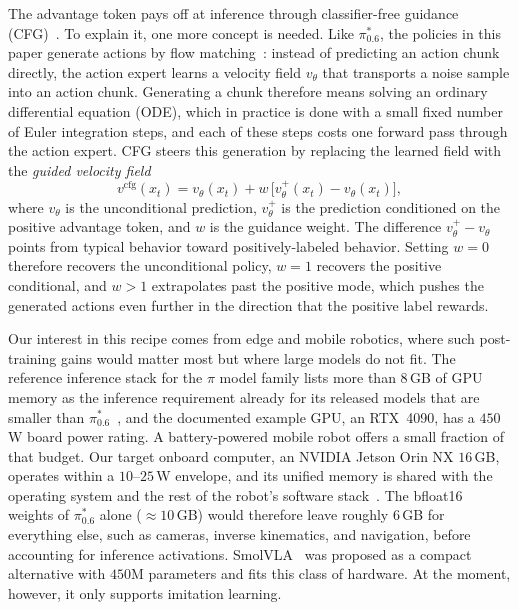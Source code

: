 \documentclass[conference]{IEEEtran}
\begin{document}
The advantage token pays off at inference through classifier-free guidance
(CFG)~\cite{b_cfg}. To explain it, one more concept is needed. Like $\pi^{*}_{0.6}$, the
policies in this paper generate actions by flow matching~\cite{b_flow}: instead of
predicting an action chunk directly, the action expert learns a velocity field $v_\theta$
that transports a noise sample into an action chunk. Generating a chunk therefore means
solving an ordinary differential equation (ODE), which in practice is done with a small
fixed number of Euler integration steps, and each of these steps costs one forward pass
through the action expert. CFG steers this generation by replacing the learned field with
the \emph{guided velocity field}
\begin{equation*}
v^{\mathrm{cfg}}(x_t)=v_\theta(x_t)+w\,\big[v_\theta^{+}(x_t)-v_\theta(x_t)\big],
\end{equation*}
where $v_\theta$ is the unconditional prediction, $v_\theta^{+}$ is the prediction
conditioned on the positive advantage token, and $w$ is the guidance weight. The difference
$v_\theta^{+}-v_\theta$ points from typical behavior toward positively-labeled behavior.
Setting $w{=}0$ therefore recovers the unconditional policy, $w{=}1$ recovers the positive
conditional, and $w{>}1$ extrapolates past the positive mode, which pushes the generated
actions even further in the direction that the positive label rewards.

Our interest in this recipe comes from edge and mobile robotics, where such
post-training gains would matter most but where large models do not fit. The reference
inference stack for the $\pi$ model family lists more than $8$\,GB of GPU memory as the
inference requirement already for its released models that are smaller than
$\pi^{*}_{0.6}$~\cite{b_openpi}, and the documented example GPU, an RTX~4090, has a
$450$\,W board power rating. A battery-powered mobile robot offers a small fraction of that
budget. Our target onboard computer, an NVIDIA Jetson Orin NX $16$\,GB, operates within a
$10$--$25$\,W envelope, and its unified memory is shared with the operating system and the
rest of the robot's software stack~\cite{b_jetson}. The bfloat16 weights of
$\pi^{*}_{0.6}$ alone ($\approx 10$\,GB) would therefore leave roughly $6$\,GB for
everything else, such as cameras, inverse kinematics, and navigation, before accounting for
inference activations. SmolVLA~\cite{b_smolvla} was proposed as a compact alternative with
$450$M parameters and fits this class of hardware. At the moment, however, it only supports
imitation learning.
\end{document}
